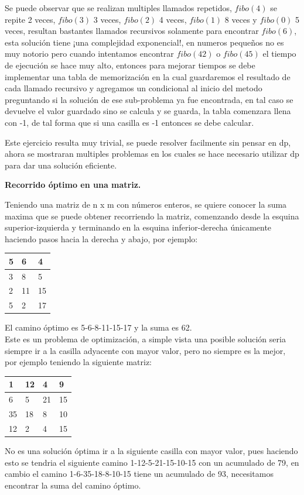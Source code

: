 \documentclass[12pt, a4paper]{article}
\newcommand\cppfile[2][]{

}
\newcommand{\subtitulo}[1]{\begin{center}\textbf{#1}\end{center}}
\begin{document}
	Se puede observar que se realizan multiples llamados repetidos, $fibo(4)$ se repite 2 veces, $fibo(3)$
	3 veces, $fibo(2)$ 4 veces, $fibo(1)$ 8 veces y $fibo(0)$ 5 veces, resultan bastantes llamados recursivos
	solamente para encontrar $fibo(6)$, esta solución tiene ¡una complejidad exponencial!, en numeros pequeños
	no es muy notorio pero cuando intentamos encontrar $fibo(42)$ o $fibo(45)$ el tiempo de ejecución se hace
	muy alto, entonces para mejorar tiempos se debe implementar una tabla de memorización en la cual guardaremos
	el resultado de cada llamado recursivo y agregamos un condicional al inicio del metodo preguntando si la
	solución de ese sub-problema ya fue encontrada, en tal caso se devuelve el valor guardado sino se calcula y se
	guarda, la tabla comenzara llena con -1, de tal forma que si una casilla es -1 entonces se debe calcular.
	\cppfile[22-31]{codigos/fibo.cpp}
	Este ejercicio resulta muy trivial, se puede resolver facilmente sin pensar en dp, ahora se mostraran
	multiples problemas en los cuales se hace necesario utilizar dp para dar una solución eficiente.
	
	\subtitulo{Recorrido óptimo en una matriz.}
	
	Teniendo una matriz de n x m con números enteros, se quiere conocer la suma maxima que se puede obtener
	recorriendo la matriz, comenzando desde la esquina superior-izquierda y terminando en la esquina inferior-derecha
	únicamente haciendo pasos hacia la derecha y abajo, por ejemplo:\\
	\begin{center}
		\begin{tabular}{|l|l|l|}
			\hline
			5  &6 &4 \\ \hline
			3  &8  &5 \\ \hline
			2 &11 &15 \\ \hline
			5 &2  &17 \\ \hline
		\end{tabular}
	\end{center}
	El camino óptimo es 5-6-8-11-15-17 y la suma es 62.\\
	
	Este es un problema de optimización, a simple vista una posible solución seria siempre ir a la casilla adyacente
	con mayor valor, pero no siempre es la mejor, por ejemplo teniendo la siguiente matriz:
	\begin{center}
		\begin{tabular}{|l|l|l|l|}
		 	\hline
			1  & 12 & 4  & 9 \\ \hline
			6  & 5  & 21 & 15 \\ \hline
			35 & 18 & 8  & 10 \\ \hline
			12 & 2  & 4  & 15 \\ \hline
		\end{tabular}
	\end{center}
	No es una solución óptima ir a la siguiente casilla con mayor valor, pues haciendo esto se tendria el siguiente
	camino 1-12-5-21-15-10-15 con un acumulado de 79, en cambio el camino 1-6-35-18-8-10-15 tiene un acumulado de 93,
	necesitamos encontrar la suma del camino óptimo.\\
	
\end{document}
